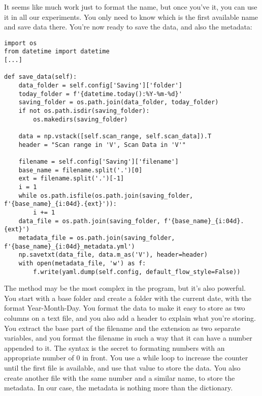 It seems like much work just to format the name, but once you've it, you can use it in all our experiments. You only need to know which is the first available name and save data there. You're now ready to save the data, and also the metadata:

\begin{verbatim}
import os
from datetime import datetime
[...]

def save_data(self):
    data_folder = self.config['Saving']['folder']
    today_folder = f'{datetime.today():%Y-%m-%d}'
    saving_folder = os.path.join(data_folder, today_folder)
    if not os.path.isdir(saving_folder):
        os.makedirs(saving_folder)

    data = np.vstack([self.scan_range, self.scan_data]).T
    header = "Scan range in 'V', Scan Data in 'V'"

    filename = self.config['Saving']['filename']
    base_name = filename.split('.')[0]
    ext = filename.split('.')[-1]
    i = 1
    while os.path.isfile(os.path.join(saving_folder, f'{base_name}_{i:04d}.{ext}')):
        i += 1
    data_file = os.path.join(saving_folder, f'{base_name}_{i:04d}.{ext}')
    metadata_file = os.path.join(saving_folder, f'{base_name}_{i:04d}_metadata.yml')
    np.savetxt(data_file, data.m_as('V'), header=header)
    with open(metadata_file, 'w') as f:
        f.write(yaml.dump(self.config, default_flow_style=False))
\end{verbatim}

The  method may be the most complex in the program, but it's also powerful. You start with a base folder and create a folder with the current date, with the format Year-Month-Day. You format the data to make it easy to store as two columns on a text file, and you also add a header to explain what you're storing. You extract the base part of the filename and the extension as two separate variables, and you format the filename in such a way that it can have a number appended to it. The syntax  is the secret to formating numbers with an appropriate number of $0$ in front. You use a while loop to increase the counter until the first file is available, and use that value to store the data. You also create another file with the same number and a similar name, to store the metadata. In our case, the metadata is nothing more than the  dictionary.


